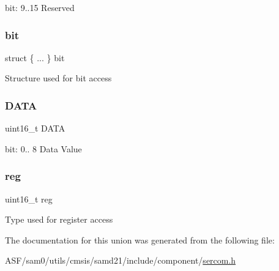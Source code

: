 bit\+: 9..15 Reserved \mbox{\label{union_s_e_r_c_o_m___u_s_a_r_t___d_a_t_a___type_a903136ca7f1fdc2f7f2406635887af4c}} 
\subsubsection{\texorpdfstring{bit}{bit}}
{\footnotesize\ttfamily struct \{ ... \}   bit}

Structure used for bit access \mbox{\label{union_s_e_r_c_o_m___u_s_a_r_t___d_a_t_a___type_acd1c79d588901607c16e8e825ec70487}} 
\subsubsection{\texorpdfstring{DATA}{DATA}}
{\footnotesize\ttfamily uint16\+\_\+t D\+A\+TA}

bit\+: 0.. 8 Data Value \mbox{\label{union_s_e_r_c_o_m___u_s_a_r_t___d_a_t_a___type_a11760f5020019f4aa8cb02e694f7cc44}} 
\subsubsection{\texorpdfstring{reg}{reg}}
{\footnotesize\ttfamily uint16\+\_\+t reg}

Type used for register access 

The documentation for this union was generated from the following file\+:\begin{DoxyCompactItemize}
\item 
A\+S\+F/sam0/utils/cmsis/samd21/include/component/\mbox{\hyperlink{utils_2cmsis_2samd21_2include_2component_2sercom_8h}{sercom.\+h}}\end{DoxyCompactItemize}
